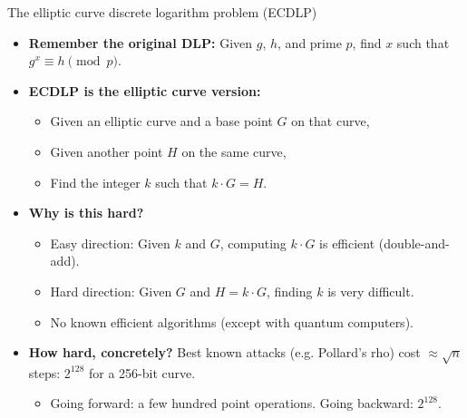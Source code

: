 \ifdefined\PRESENTATION\else\PassOptionsToClass{handout}{beamer}\fi\documentclass[aspectratio=169, lualatex]{beamer}
\begin{document}
\begin{frame}{The elliptic curve discrete logarithm problem (ECDLP)}
	\begin{itemize}[<+->]
		\item \textbf{Remember the original DLP:} Given $g$, $h$, and prime $p$, find $x$ such that $g^x \equiv h \pmod{p}$.
		\item \textbf{ECDLP is the elliptic curve version:}
		      \begin{itemize}
			      \item Given an elliptic curve and a base point $G$ on that curve,
			      \item Given another point $H$ on the same curve,
			      \item Find the integer $k$ such that $k \cdot G = H$.
		      \end{itemize}
		\item \textbf{Why is this hard?}
		      \begin{itemize}
			      \item Easy direction: Given $k$ and $G$, computing $k \cdot G$ is efficient (double-and-add).
			      \item Hard direction: Given $G$ and $H = k \cdot G$, finding $k$ is very difficult.
			      \item No known efficient algorithms (except with quantum computers).
		      \end{itemize}
		\item \textbf{How hard, concretely?} Best known attacks (e.g. Pollard's rho) cost $\approx \sqrt{n}$ steps: $2^{128}$ for a 256-bit curve.
		      \begin{itemize}
			      \item Going forward: a few hundred point operations. Going backward: $2^{128}$.
		      \end{itemize}
	\end{itemize}
\end{frame}
\end{document}
